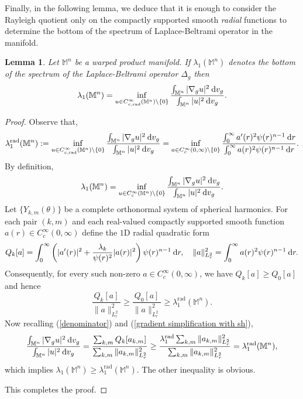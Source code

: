 \documentclass[a4paper,11pt,reqno]{amsart}
\renewcommand\eqref[1]{(\ref{#1})}
\theoremstyle{plain}
\newtheorem{lemma}{Lemma}[section]
\numberwithin{equation}{section} \allowdisplaybreaks
\newcommand{\dvg}{\: {\rm d}v_{g}}
\newcommand{\gradg}{\nabla_g}
\newcommand{\lapg}{\Delta_{g}}
\newcommand{\m}{\mathbb{M}^n}
\newcommand{\dr}{\:{\rm d}r}
\begin{document}
Finally, in the following lemma, we deduce that it is enough to consider the Rayleigh quotient only on the compactly supported smooth \textit{radial} functions to determine the bottom of the spectrum of Laplace-Beltrami operator in the manifold.
\begin{lemma}\label{radial rayleigh quotient}
    Let $\m$ be a warped product manifold. If $\lambda_1(\m)$ denotes the bottom of the spectrum of the Laplace-Beltrami operator $\lapg$ then
    \begin{equation*}
        \lambda_1(\m)=\inf_{u \in C^{\infty}_{c,\mathrm{rad}}(\m)\setminus \{0\}}\frac{\int_{\m}|\gradg u|^2\dvg}{\int_{\m}|u|^2\dvg}.
    \end{equation*}
\end{lemma}
\begin{proof}
Observe that,
\begin{equation*}
    \lambda_1^{\mathrm{rad}}(\m):=\inf_{u \in C^{\infty}_{c,\mathrm{rad}}(\m)\setminus \{0\}}\frac{\int_{\m}|\gradg u|^2\dvg}{\int_{\m}|u|^2\dvg}=\inf_{a\in C_c^{\infty}(0,\infty)\setminus \{0\}}\frac{\int_0^{\infty}a'(r)^2\psi(r)^{n-1}\dr}{\int_0^{\infty}a(r)^2\psi(r)^{n-1}\dr}.
\end{equation*}
   By definition,
    \begin{equation*}
        \lambda_1(\m)=\inf_{u \in C^{\infty}_{c}(\m)\setminus \{0\}}\frac{\int_{\m}|\gradg u|^2\dvg}{\int_{\m}|u|^2\dvg}.
    \end{equation*}
Let $\{Y_{k,m}(\theta)\}$ be a complete orthonormal system of spherical harmonics. For each pair $(k,m)$ and each real-valued compactly supported smooth function $a(r)\in C_c^{\infty}(0,\infty)$ define the $1$D radial quadratic form 
\begin{equation}
    Q_k[a]=\int_0^{\infty}\left(|a'(r)|^2+\frac{\lambda_k}{\psi(r)^2}|a(r)|^2\right)\psi(r)^{n-1}\dr,\quad \|a\|^2_{L^2_r}=\int_0^{\infty}a(r)^2\psi(r)^{n-1}\dr.
\end{equation}
Consequently, for every such non-zero $a\in C^{\infty}_c(0,\infty)$, we have $Q_k[a]\geq Q_0[a]$ and hence
\begin{equation*}
    \frac{Q_k[a]}{\|a\|^2_{L^2_r}}\geq \frac{Q_0[a]}{\|a\|^2_{L^2_r}}\geq \lambda_1^{\text{rad}}(\m).
\end{equation*}
Now recalling \eqref{denominator} and \eqref{gradient simplification with sh},
\begin{equation*}
    \frac{\int_{\m}|\nabla_gu|^2\dvg}{\int_{\m}|u|^2\dvg}=\frac{\sum_{k,m}Q_k[a_{k,m}]}{\sum_{k,m}\|a_{k,m}\|^2_{L^2_r}}\geq \frac{\lambda_1^{\mathrm{rad}}\sum_{k,m}\|a_{k,m}\|^2_{L^2_r}}{\sum_{k,m}\|a_{k,m}\|^2_{L^2_r}}=\lambda_1^{\mathrm{rad}}(\m),
\end{equation*}
which implies $\lambda_1(\m)\geq \lambda_1^{\mathrm{rad}}(\m)$. The other inequality is obvious.

This completes the proof.

\end{proof}
\end{document}
